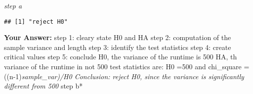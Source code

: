\documentclass[
]{article}
\newenvironment{Shaded}{\begin{snugshade}}{\end{snugshade}}
\newcommand{\AttributeTok}[1]{\textcolor[rgb]{0.13,0.29,0.53}{#1}}
\newcommand{\ControlFlowTok}[1]{\textcolor[rgb]{0.13,0.29,0.53}{\textbf{#1}}}
\newcommand{\DecValTok}[1]{\textcolor[rgb]{0.00,0.00,0.81}{#1}}
\newcommand{\FloatTok}[1]{\textcolor[rgb]{0.00,0.00,0.81}{#1}}
\newcommand{\FunctionTok}[1]{\textcolor[rgb]{0.13,0.29,0.53}{\textbf{#1}}}
\newcommand{\NormalTok}[1]{#1}
\newcommand{\OtherTok}[1]{\textcolor[rgb]{0.56,0.35,0.01}{#1}}
\newcommand{\SpecialCharTok}[1]{\textcolor[rgb]{0.81,0.36,0.00}{\textbf{#1}}}
\newcommand{\StringTok}[1]{\textcolor[rgb]{0.31,0.60,0.02}{#1}}
\begin{document}
\emph{step a}

\begin{Shaded}
\end{Shaded}

\begin{verbatim}
## [1] "reject H0"
\end{verbatim}

\textbf{Your Answer:} step 1: cleary state H0 and HA step 2: computation
of the sample variance and length step 3: identify the test statistics
step 4: create critical values step 5: conclude H0, the variance of the
runtime is 500 HA, th variance of the runtime in not 500 test statistics
are: H0 =500 and chi\_square = ((n-1)\emph{sample\_var)/H0 Conclusion:
reject H0, since the variance is significantly different from 500 }step
b*

\begin{Shaded}
\end{Shaded}
\end{document}
